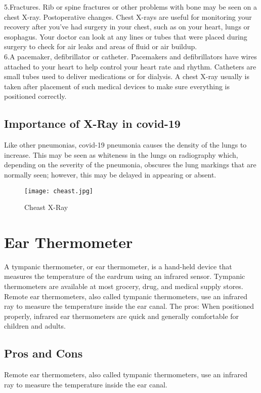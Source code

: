 \documentclass[12pt]{report}
\begin{document}
5.Fractures. Rib or spine fractures or other problems with bone may be seen on a chest X-ray.
Postoperative changes. Chest X-rays are useful for monitoring your recovery after you've had surgery in your chest, such as on your heart, lungs or esophagus. Your doctor can look at any lines or tubes that were placed during surgery to check for air leaks and areas of fluid or air buildup.\\

6.A pacemaker, defibrillator or catheter. Pacemakers and defibrillators have wires attached to your heart to help control your heart rate and rhythm. Catheters are small tubes used to deliver medications or for dialysis. A chest X-ray usually is taken after placement of such medical devices to make sure everything is positioned correctly.

\subsection{Importance of X-Ray in covid-19}
Like other pneumonias, covid-19 pneumonia causes the density of the lungs to increase. This may be seen as whiteness in the lungs on radiography which, depending on the severity of the pneumonia, obscures the lung markings that are normally seen; however, this may be delayed in appearing or absent.
\begin{figure}[h]
\centering
\texttt{[image: cheast.jpg]}
\caption{Cheast X-Ray}
\end{figure}
\clearpage

\section{Ear Thermometer}
A tympanic thermometer, or ear thermometer, is a hand-held device that measures the temperature of the eardrum using an infrared sensor. Tympanic thermometers are available at most grocery, drug, and medical supply stores.\\
Remote ear thermometers, also called tympanic thermometers, use an infrared ray to measure the temperature inside the ear canal. The pros: When positioned properly, infrared ear thermometers are quick and generally comfortable for children and adults.\\
\subsection{Pros and Cons}
Remote ear thermometers, also called tympanic thermometers, use an infrared ray to measure the temperature inside the ear canal.
\end{document}
